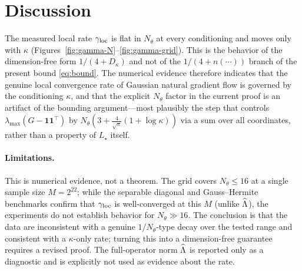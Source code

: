 \documentclass[11pt]{article}
\begin{document}
\section{Discussion}

The measured local rate $\gamma_{\mathrm{loc}}$ is flat in $N_\theta$ at every conditioning and
moves only with $\kappa$ (Figures~\ref{fig:gamma-N}--\ref{fig:gamma-grid}). This
is the behavior of the dimension-free form $1/(4+D_\kappa)$ and not of the
$1/(4+n(\cdots))$ branch of the present bound \eqref{eq:bound}. The numerical
evidence therefore indicates that the genuine local convergence rate of Gaussian
natural gradient flow is governed by the conditioning $\kappa$, and that the
explicit $N_\theta$ factor in the current proof is an artifact of the bounding
argument---most plausibly the step that controls $\lambda_{\max}(G-\mathbf{1}\mathbf{1}^\top)$
by $N_\theta(3+\tfrac{4}{\sqrt\pi}(1+\log\kappa))$ via a sum over all
coordinates, rather than a property of $L_\star$ itself.

\paragraph{Limitations.}
This is numerical evidence, not a theorem. The grid covers $N_\theta\le16$ at a
single sample size $M=2^{22}$; while the separable diagonal and Gauss--Hermite
benchmarks confirm that $\gamma_{\mathrm{loc}}$ is well-converged at this $M$ (unlike $\widehat{\Lambda}$),
the experiments do not establish behavior for $N_\theta\gg16$. The conclusion is
that the data are inconsistent with a genuine $1/N_\theta$-type decay over the
tested range and consistent with a $\kappa$-only rate; turning this into a
dimension-free guarantee requires a revised proof. The full-operator norm $\widehat{\Lambda}$
is reported only as a diagnostic and is explicitly not used as evidence about the
rate.
\end{document}
